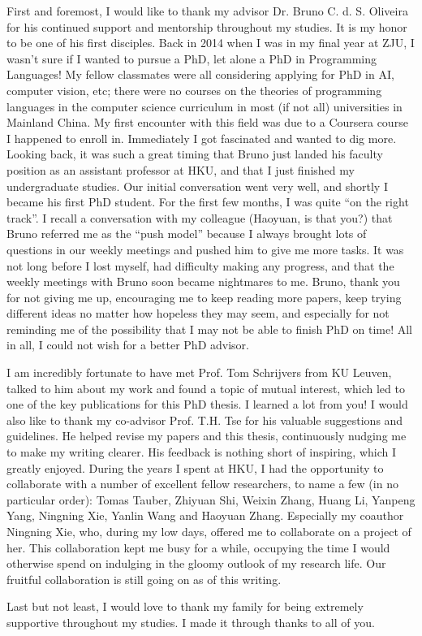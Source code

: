 
First and foremost, I would like to thank my advisor Dr. Bruno C. d. S. Oliveira
for his continued support and mentorship throughout my studies. It is my honor
to be one of his first disciples. Back in 2014 when I was in my final year at
ZJU, I wasn't sure if I wanted to pursue a PhD, let alone a PhD in Programming
Languages! My fellow classmates were all considering applying for PhD in AI,
computer vision, etc; there were no courses on the theories of programming
languages in the computer science curriculum in most (if not all) universities
in Mainland China. My first encounter with this field was due to a Coursera
course I happened to enroll in. Immediately I got fascinated and wanted to dig
more. Looking back, it was such a great timing that Bruno just landed his
faculty position as an assistant professor at HKU, and that I just finished my
undergraduate studies. Our initial conversation went very well, and shortly I
became his first PhD student. For the first few months, I was quite ``on the
right track''. I recall a conversation with my colleague (Haoyuan, is that you?)
that Bruno referred me as the ``push model'' because I always brought lots of
questions in our weekly meetings and pushed him to give me more tasks. It was
not long before I lost myself, had difficulty making any progress, and that the
weekly meetings with Bruno soon became nightmares to me. Bruno, thank you for
not giving me up, encouraging me to keep reading more papers, keep trying
different ideas no matter how hopeless they may seem, and especially for not
reminding me of the possibility that I may not be able to finish PhD on time!
All in all, I could not wish for a better PhD advisor.

I am incredibly fortunate to have met Prof. Tom Schrijvers from KU Leuven,
talked to him about my work and found a topic of mutual interest, which led to
one of the key publications for this PhD thesis. I learned a lot from you! I
would also like to thank my co-advisor Prof. T.H. Tse for his valuable
suggestions and guidelines. He helped revise my papers and this thesis,
continuously nudging me to make my writing clearer. His feedback is nothing
short of inspiring, which I greatly enjoyed. During the years I spent at HKU, I
had the opportunity to collaborate with a number of excellent fellow
researchers, to name a few (in no particular order): Tomas Tauber, Zhiyuan Shi,
Weixin Zhang, Huang Li, Yanpeng Yang, Ningning Xie, Yanlin Wang and Haoyuan
Zhang. Especially my coauthor Ningning Xie, who, during my low days, offered me
to collaborate on a project of her. This collaboration kept me busy for a while, occupying the time I would otherwise spend on indulging in the gloomy
outlook of my research life. Our fruitful collaboration is still going on as of
this writing.

Last but not least, I would love to thank my family for being extremely
supportive throughout my studies. I made it through thanks to all of you.